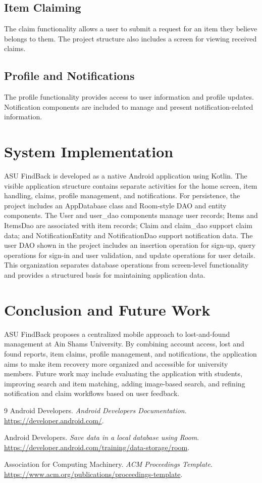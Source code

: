 \documentclass[sigconf]{acmart}
\begin{document}
\subsection{Item Claiming}
The claim functionality allows a user to submit a request for an item they believe belongs to them. The project structure also includes a screen for viewing received claims.

\subsection{Profile and Notifications}
The profile functionality provides access to user information and profile updates. Notification components are included to manage and present notification-related information.

\section{System Implementation}
ASU FindBack is developed as a native Android application using Kotlin. The visible application structure contains separate activities for the home screen, item handling, claims, profile management, and notifications. For persistence, the project includes an AppDatabase class and Room-style DAO and entity components. The User and user\_dao components manage user records; Items and ItemsDao are associated with item records; Claim and claim\_dao support claim data; and NotificationEntity and NotificationDao support notification data. The user DAO shown in the project includes an insertion operation for sign-up, query operations for sign-in and user validation, and update operations for user details. This organization separates database operations from screen-level functionality and provides a structured basis for maintaining application data.

\section{Conclusion and Future Work}
ASU FindBack proposes a centralized mobile approach to lost-and-found management at Ain Shams University. By combining account access, lost and found reports, item claims, profile management, and notifications, the application aims to make item recovery more organized and accessible for university members. Future work may include evaluating the application with students, improving search and item matching, adding image-based search, and refining notification and claim workflows based on user feedback.

\begin{thebibliography}{9}
Android Developers. \emph{Android Developers Documentation}. \url{https://developer.android.com/}.

Android Developers. \emph{Save data in a local database using Room}. \url{https://developer.android.com/training/data-storage/room}.

Association for Computing Machinery. \emph{ACM Proceedings Template}. \url{https://www.acm.org/publications/proceedings-template}.
\end{thebibliography}
\end{document}
